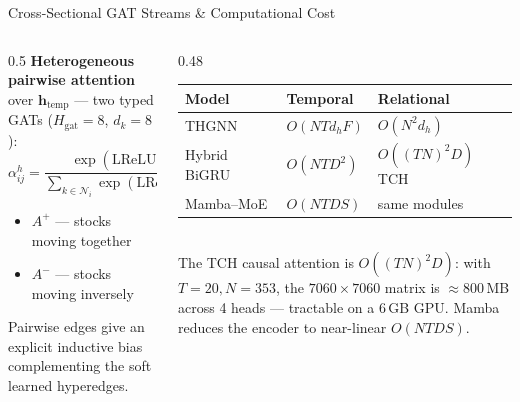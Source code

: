 \documentclass[aspectratio=169, 10pt]{beamer}
\newcommand{\myvec}[1]{\mathbf{#1}}
\begin{document}
\begin{frame}{Cross-Sectional GAT Streams \& Computational Cost}
  \begin{columns}[T]
    \begin{column}{0.5\textwidth}
      \textbf{Heterogeneous pairwise attention} over $\myvec{h}_\text{temp}$ — two typed GATs
      ($H_\text{gat}{=}8$, $d_k{=}8$):
      \[ \alpha_{ij}^h=\frac{\exp(\text{LReLU}(\myvec{a}_h^\top[\myvec{W}_h\myvec{h}_i\|\myvec{W}_h\myvec{h}_j]))}
                            {\sum_{k\in\mathcal{N}_i}\exp(\text{LReLU}(\myvec{a}_h^\top[\myvec{W}_h\myvec{h}_i\|\myvec{W}_h\myvec{h}_k]))} \]
      \begin{itemize}\setlength{\itemsep}{2pt}
        \item \textcolor{primary}{$A^+$ — stocks moving together}
        \item \textcolor{negative}{$A^-$ — stocks moving inversely}
      \end{itemize}
      Pairwise edges give an explicit inductive bias \alert{complementing} the soft learned hyperedges.
    \end{column}
    \begin{column}{0.48\textwidth}
      \centering
      \renewcommand{\arraystretch}{1.3}
      \scriptsize
      \begin{tabular}{lll}
        \toprule
        \textbf{Model} & \textbf{Temporal} & \textbf{Relational} \\
        \midrule
        THGNN        & $O(NTd_hF)$    & $O(N^2 d_h)$ \\
        Hybrid BiGRU & $O(NTD^2)$     & $O((TN)^2D)$ TCH \\
        Mamba--MoE   & $O(NTDS)$      & same modules \\
        \bottomrule
      \end{tabular}\\[5pt]
      \footnotesize
      The TCH causal attention is $O((TN)^2D)$: with $T{=}20,N{=}353$, the
      $7060{\times}7060$ matrix is ${\approx}800$\,MB across 4 heads —
      \alert{tractable on a 6\,GB GPU}. Mamba reduces the encoder to
      near-linear $O(NTDS)$.
    \end{column}
  \end{columns}
\end{frame}
\end{document}
